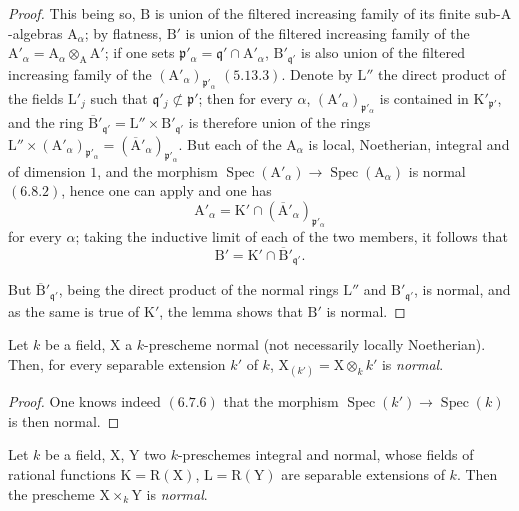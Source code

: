 \begin{proof}
This being so, $\mathrm{B}$ is union of the filtered increasing family of its finite sub-$\mathrm{A}$-algebras
$\mathrm{A}_\alpha$; by flatness, $\mathrm{B}'$ is union of the filtered increasing family of the $\mathrm{A}'_\alpha=\mathrm{A}_\alpha\otimes_\mathrm{A}\mathrm{A}'$;
if one sets $\mathfrak{p}'_\alpha=\mathfrak{q}'\cap\mathrm{A}'_\alpha$, $\mathrm{B}'_{\mathfrak{q}'}$ is also union of the filtered increasing family of the $(\mathrm{A}'_\alpha)_{\mathfrak{p}'_\alpha}$
$(5.13.3)$. Denote by $\mathrm{L}''$ the direct product of the fields $\mathrm{L}'_j$ such that $\mathfrak{q}'_j\not\subset\mathfrak{p}'$; then for
every $\alpha$, $(\mathrm{A}'_\alpha)_{\mathfrak{p}'_\alpha}$ is contained in $\mathrm{K}'_{\mathfrak{p}'}$, and the ring $\overline{\mathrm{B}}'_{\mathfrak{q}'}=\mathrm{L}''\times\mathrm{B}'_{\mathfrak{q}'}$ is therefore union of the
rings $\mathrm{L}''\times(\mathrm{A}'_\alpha)_{\mathfrak{p}'_\alpha}=(\overline{\mathrm{A}}'_\alpha)_{\mathfrak{p}'_\alpha}$. But each of the $\mathrm{A}_\alpha$ is local, Noetherian, integral and of
dimension $1$, and the morphism $\operatorname{Spec}(\mathrm{A}'_\alpha)\to\operatorname{Spec}(\mathrm{A}_\alpha)$ is normal $(6.8.2)$, hence one can
apply  and one has
\[
  \mathrm{A}'_\alpha=\mathrm{K}'\cap(\overline{\mathrm{A}}'_\alpha)_{\mathfrak{p}'_\alpha}
\]
for every $\alpha$; taking the inductive limit of each of the two members, it follows that
\[
  \mathrm{B}'=\mathrm{K}'\cap\overline{\mathrm{B}}'_{\mathfrak{q}'}.
\]

But $\overline{\mathrm{B}}'_{\mathfrak{q}'}$, being the direct product of the normal rings $\mathrm{L}''$ and $\mathrm{B}'_{\mathfrak{q}'}$, is normal, and as
the same is true of $\mathrm{K}'$, the lemma  shows that $\mathrm{B}'$ is normal.
\end{proof}

\begin{corollary}[6.14.2]
\label{IV.6.14.2}
Let $k$ be a field, $\mathrm{X}$ a $k$-prescheme normal \textup{(not necessarily
locally Noetherian)}. Then, for every separable extension $k'$ of $k$, $\mathrm{X}_{(k')}=\mathrm{X}\otimes_k k'$ is
\emph{normal}.
\end{corollary}

\begin{proof}
One knows indeed $(6.7.6)$ that the morphism $\operatorname{Spec}(k')\to\operatorname{Spec}(k)$ is then normal.
\end{proof}

\begin{corollary}[6.14.3]
\label{IV.6.14.3}
Let $k$ be a field, $\mathrm{X}$, $\mathrm{Y}$ two $k$-preschemes integral and normal,
whose fields of rational functions $\mathrm{K}=\mathrm{R}(\mathrm{X})$, $\mathrm{L}=\mathrm{R}(\mathrm{Y})$ are separable extensions of $k$.
Then the prescheme $\mathrm{X}\times_k\mathrm{Y}$ is \emph{normal}.
\end{corollary}

